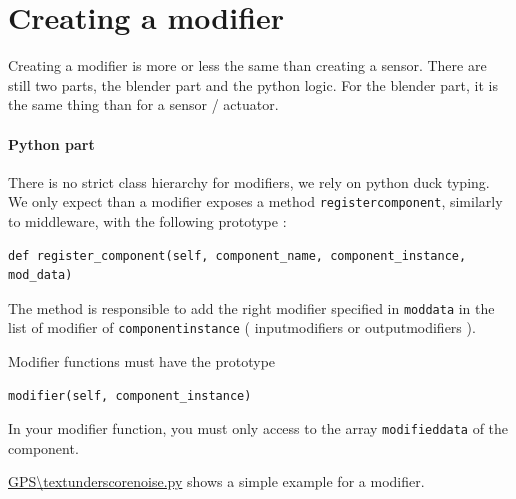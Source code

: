\documentclass[twoside,a4paper,10pt]{report}
\newcommand{\dokutitlelevelone}[1]{\chapter{#1}}
\newcommand{\dokutitlelevelfour}[1]{\subsubsection{#1}}
\newcommand{\dokumonospace}[1]{\texttt{#1}}
\begin{document}
\dokutitlelevelone{Creating a modifier}
\label{7ab0c580b65197ee03abbb17c8fa4241}%
\label{ddaae98df566ec14d90bd06e83e3787f}%

Creating a modifier is more or less the same than creating a sensor. There are
still two parts, the blender part and the python logic. For the blender part,
it is the same thing than for a sensor / actuator.


\dokutitlelevelfour{Python part}

There is no strict class hierarchy for modifiers, we rely on python duck
typing. We only expect than a modifier exposes a method \dokumonospace{register{\textunderscore}component},
similarly to middleware, with the following prototype :


\lstset{language=python}
\begin{lstlisting}
def register_component(self, component_name, component_instance, mod_data)

\end{lstlisting}
The method is responsible to add the right modifier specified in \dokumonospace{mod{\textunderscore}data}
in the list of modifier of \dokumonospace{component{\textunderscore}instance} ( input{\textunderscore}modifiers or
output{\textunderscore}modifiers ). 

Modifier functions must have the prototype


\lstset{language=python}
\begin{lstlisting}
modifier(self, component_instance)

\end{lstlisting}
In your modifier function, you must only access to the array \dokumonospace{modified{\textunderscore}data}
of the component.

\href{http://trac.laas.fr/git/morse/tree/src/morse/modifiers/gps_noise.py}{GPS{{\textbackslash}textunderscore}noise.py} shows a simple example for a modifier.
\end{document}
